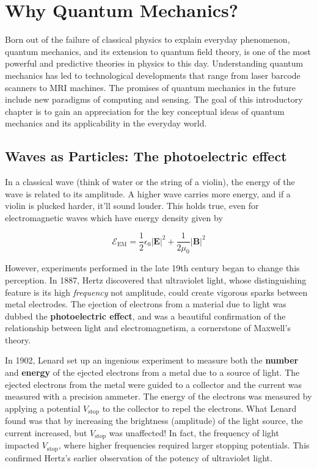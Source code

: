 \setchapterpreamble[u]{\margintoc}
\chapter{Why Quantum Mechanics?}

Born out of the failure of classical physics to explain everyday phenomenon, quantum mechanics, and its extension to quantum field theory, is one of the most powerful and predictive theories in physics to this day. Understanding quantum mechanics has led to technological developments that range from laser barcode scanners to MRI machines. The promises of quantum mechanics in the future include new paradigms of computing and sensing. The goal of this introductory chapter is to gain an appreciation for the key conceptual ideas of quantum mechanics and its applicability in the everyday world.

\section{Waves as Particles: The photoelectric effect}

In a classical wave (think of water or the string of a violin), the energy of the wave is related to its amplitude. A higher wave carries more energy, and if a violin is plucked harder, it'll sound louder. This holds true, even for electromagnetic waves which have energy density given by

\begin{equation}
\mathcal{E}_{\text{EM}} = \frac{1}{2}\epsilon_0 |\mathbf{E}|^2 + \frac{1}{2\mu_0} |\mathbf{B}|^2 
\end{equation}

However, experiments performed in the late 19th century began to change this perception. In 1887, Hertz discovered that ultraviolet light, whose distinguishing feature is its high \textit{frequency} not amplitude, could create vigorous sparks between metal electrodes. The ejection of electrons from a material due to light was dubbed the \textbf{photoelectric effect}, and was a beautiful confirmation of the relationship between light and electromagnetism, a cornerstone of Maxwell's theory. 

In 1902, Lenard set up an ingenious experiment to measure both the \textbf{number} and \textbf{energy} of the ejected electrons from a metal due to a source of light. The ejected electrons from the metal were guided to a collector and the current was measured with a precision ammeter. The energy of the electrons was measured by applying a potential $V_{\text{stop}}$ to the collector to repel the electrons. What Lenard found was that by increasing the brightness (amplitude) of the light source, the current increased, but $V_{\text{stop}}$ was unaffected! In fact, the frequency of light impacted $V_{\text{stop}} $, where higher frequencies required larger stopping potentials. This confirmed Hertz's earlier observation of the potency of ultraviolet light. 

